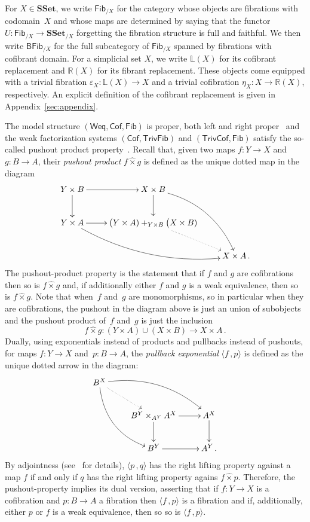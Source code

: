 \documentclass[reqno,10pt,a4paper,oneside]{amsart}
\numberwithin{equation}{section}
\theoremstyle{mythm}
\theoremstyle{mydef}
\theoremstyle{myrmk}
\newcommand{\ie}{\text{i.e.\ }}
\newcommand{\myemph}{\textit}
\newcommand{\co}{\colon}
\newcommand{\SSet}{\mathbf{SSet}}
\newcommand{\Weq}{\mathsf{Weq}}
\newcommand{\hattimes}{\mathbin{\hat{\times}}}
\newcommand{\Cof}{\mathsf{Cof}}
\newcommand{\TrivFib}{\mathsf{TrivFib}}
\newcommand{\Fib}{\mathsf{Fib}}
\newcommand{\TrivCof}{\mathsf{TrivCof}}
\newcommand{\BFFib}{\mathsf{BFib}}
\begin{document}
For $X \in \SSet$, we write $\Fib_{/X}$ for the category whose objects are fibrations with codomain~$X$ 
and whose maps are determined by saying that the functor $U \co \Fib_{/X} \to \SSet_{/X}$ forgetting the
fibration structure is  full and faithful. We then write $\BFFib_{/X}$ for the full subcategory of $\Fib_{/X}$  spanned by fibrations with cofibrant domain. For a simplicial set $X$, we write $\mathbb{L}(X)$ for its cofibrant replacement and $\mathbb{R}(X)$ for its
fibrant replacement. These objects come equipped with a trivial fibration $\varepsilon_X \co \mathbb{L}(X) \to X$ and a trivial cofibration $\eta_X \co 
X \to \mathbb{R}(X)$, respectively. An explicit definition of the cofibrant replacement is given 
in Appendix~\ref{sec:appendix}.

\medskip

The model structure $(\Weq, \Cof, \Fib)$ is proper, \ie both left and right proper~\cite[Propositions 2.2.9 and 3.5.2]{henry2019qms}
and the weak factorization systems $(\Cof, \TrivFib)$ and $(\TrivCof, \Fib)$
satisfy the so-called pushout product property~\cite[Proposition 5.1.5 and Corollary 5.2.3]{henry2018wms}. Recall that, given two maps $f \co Y \rightarrow X$ and $g \co B \rightarrow A$, their \emph{pushout product} $f \hattimes g$ is defined as the unique dotted map in the diagram
\[
\xymatrix{
Y \times B \ar[r] \ar[d] &  X \times B \ar[d] \ar@/^1.5pc/[ddr] \\
Y \times A \ar[r]  \ar@/_1.5pc/[drr] & \displaystyle \big( Y \times A ) +_{Y \times B} \big( X \times B ) \ar@{.>}[dr]  \\
 & & X \times A \, . }
 \]
The pushout-product property is  the statement that  if $f$ and $g$ are cofibrations then so is $f \hattimes g$
and, if additionally either $f$ and $g$ is a weak equivalence, then so is $f \hattimes g$.
Note that when~$f$ and~$g$ are monomorphisms, so in particular when they are cofibrations, the pushout in the diagram above is just an union of subobjects and the pushout product of~$f$ and~$g$ is just the inclusion
\[  
f \hattimes g \co (Y \times A) \cup (X \times B) \rightarrow X \times A \, .
\]
Dually, using  exponentials instead of products and pullbacks instead of pushouts, for maps $f \co Y \rightarrow X$ and~$p \co B \rightarrow A$, the \myemph{pullback exponential}  $\langle f \, , p \rangle$ is defined as the unique dotted arrow in the diagram:
\[
\xymatrix{
 B^X \ar@{.>}[dr] \ar@/^1.5pc/[drr] \ar@/_1.5pc/[ddr] \\
& B^Y \times_{A^Y} A^X \ar[r] \ar[d] &  A^X \ar[d]  \\
& B^Y \ar[r] & A^Y  \, . \\
 }
 \]
By adjointness (see~\cite{joyal-tierney-segal} for details), $\langle p \, , q \rangle $ has the right lifting property against a map $f$  if and only if $q$ has the right lifting property agains $f \hattimes p$.
Therefore, the pushout-property  implies its dual version, asserting that  if $f \co Y \to X$ is a cofibration and $p \co B \to A$ a fibration then $\langle f \, , p \rangle$ is a fibration and if, additionally,  either $p$ or $f$ is a weak equivalence, then so so is $\langle f \, , p \rangle$.
\end{document}
